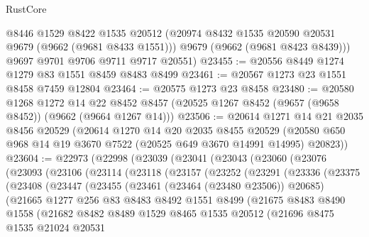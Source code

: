 \begin{lexlean}{RustCore}
\begin{coremodule}
        @8446
        @1529
        @8422
        @1535
        @20512
        (@20974 @8432 @1535 @20590 @20531 @9679 (@9662 (@9681 @8433 @1551)))
        @9679
        (@9662 (@9681 @8423 @8439)))
      @9697
      @9701
      @9706
      @9711
      @9717
      @20551)
@23455 := @20556 @8449 @1274 @1279 @83 @1551 @8459 @8483 @8499
@23461 := @20567 @1273 @23 @1551 @8458 @7459 @12804
@23464 := @20575 @1273 @23 @8458
@23480 := @20580
    @1268
    @1272
    @14
    @22
    @8452
    @8457
    (@20525 @1267 @8452 (@9657 (@9658 @8452)) (@9662 (@9664 @1267 @14)))
@23506 := @20614
    @1271
    @14
    @21
    @2035
    @8456
    @20529
    (@20614
      @1270
      @14
      @20
      @2035
      @8455
      @20529
      (@20580 @650 @968 @14 @19 @3670 @7522 (@20525 @649 @3670 @14991 @14995) @20823))
@23604 := @22973
    (@22998
      (@23039
        (@23041
          (@23043
            (@23060
              (@23076
                (@23093
                  (@23106
                    (@23114
                      (@23118
                        (@23157
                          (@23252
                            (@23291
                              (@23336
                                (@23375
                                  (@23408
                                    (@23447
                                      (@23455
                                        (@23461 (@23464 (@23480 @23506)) @20685)
                                        (@21665
                                          @1277
                                          @256
                                          @83
                                          @8483
                                          @8492
                                          @1551
                                          @8499
                                          (@21675
                                            @8483
                                            @8490
                                            @1558
                                            (@21682
                                              @8482
                                              @8489
                                              @1529
                                              @8465
                                              @1535
                                              @20512
                                              (@21696
                                                @8475
                                                @1535
                                                @21024
                                                @20531

\end{coremodule}
\end{lexlean}
